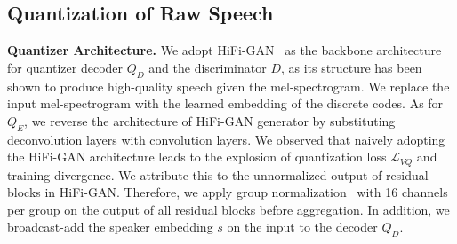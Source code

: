 \documentclass[letterpaper]{article}
\begin{document}
\subsection{Quantization of Raw Speech}
\label{ssec:quant}
\textbf{Quantizer Architecture.}
We adopt HiFi-GAN~\cite{10.5555/3495724.3497152} as the backbone architecture for quantizer decoder $Q_D$ and the discriminator $D$, as its structure has been shown to produce high-quality speech given the mel-spectrogram.
We replace the input mel-spectrogram with the learned embedding of the discrete codes.
As for $Q_E$, we reverse the architecture of HiFi-GAN generator by substituting deconvolution layers with convolution layers.
We observed that naively adopting the HiFi-GAN architecture leads to the explosion of quantization loss $\mathcal{L}_{VQ}$ and training divergence.
We attribute this to the unnormalized output of residual blocks in HiFi-GAN.
Therefore, we apply group normalization~\cite{DBLP:journals/ijcv/WuH20} with 16 channels per group on the output of all residual blocks before aggregation.
In addition, we broadcast-add the speaker embedding $s$ on the input to the decoder $Q_D$.
\end{document}
